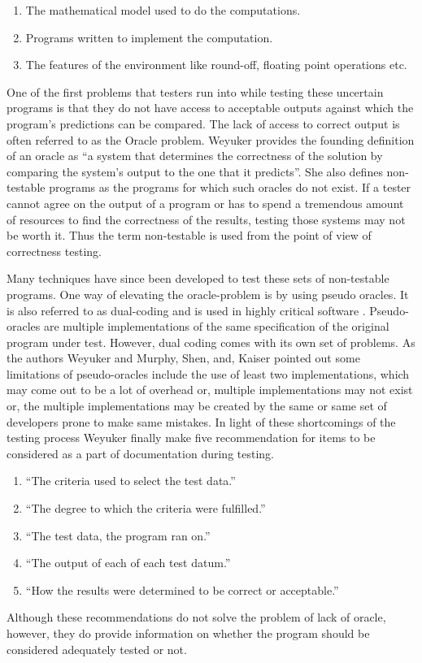 \begin{enumerate}
  \item The mathematical model used to do the computations.
  \item Programs written to implement the computation.
  \item The features of the environment like round-off, floating point operations etc.
\end{enumerate}

 One of the first problems that testers run into while testing these uncertain programs is that they do not have access to acceptable outputs against which the program's predictions can be compared. The lack of access to correct output is often referred to as the Oracle problem. Weyuker \cite{Weyuker} provides the founding definition of an oracle as \enquote{a system that determines the correctness of the solution by comparing the system's output to the one that it predicts}. She also defines non-testable programs as the programs for which such oracles do not exist. If a tester cannot agree on the output of a program or has to spend a tremendous amount of resources to find the correctness of the results, testing those systems may not be worth it. Thus the term non-testable is used from the point of view of correctness testing. 
 
 Many techniques have since been developed to test these sets of non-testable programs. One way of elevating the oracle-problem is by using pseudo oracles. It is also referred to as dual-coding and is used in highly critical software \cite{Weyuker,Murphy2009}. Pseudo-oracles are multiple implementations of the same specification of the original program under test.
 However, dual coding comes with its own set of problems. As the authors Weyuker \cite{Weyuker} and Murphy, Shen, and, Kaiser \cite{Murphy2009} pointed out some limitations of pseudo-oracles include the use of least two implementations, which may come out to be a lot of overhead or, multiple implementations may not exist or, the multiple implementations may be created by the same or same set of developers prone to make same mistakes.
 In light of these shortcomings of the testing process Weyuker \cite{Weyuker} finally make five recommendation for items to be considered as a part of documentation during testing.
\begin{enumerate}
  \item \enquote{The criteria used to select the test data.}
  \item \enquote{The degree to which the criteria were fulfilled.}
  \item \enquote{The test data, the program ran on.}
  \item \enquote{The output of each of each test datum.}
  \item \enquote{How the results were determined to be correct or acceptable.}
\end{enumerate}
Although these recommendations do not solve the problem of lack of oracle, however, they do provide information on whether the program should be considered adequately tested or not.


